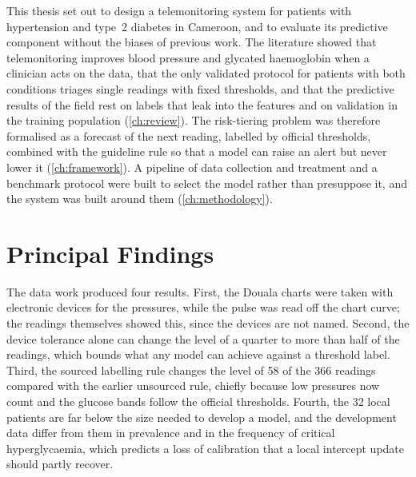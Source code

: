 \documentclass[11pt,a4paper,oneside]{report}
\begin{document}
This thesis set out to design a telemonitoring system for patients with hypertension and type~2 diabetes in Cameroon, and to evaluate its predictive component without the biases of previous work. The literature showed that telemonitoring improves blood pressure and glycated haemoglobin when a clinician acts on the data, that the only validated protocol for patients with both conditions triages single readings with fixed thresholds, and that the predictive results of the field rest on labels that leak into the features and on validation in the training population (\cref{ch:review}). The risk-tiering problem was therefore formalised as a forecast of the next reading, labelled by official thresholds, combined with the guideline rule so that a model can raise an alert but never lower it (\cref{ch:framework}). A pipeline of data collection and treatment and a benchmark protocol were built to select the model rather than presuppose it, and the system was built around them (\cref{ch:methodology}).

\section*{Principal Findings}

The data work produced four results. First, the Douala charts were taken with electronic devices for the pressures, while the pulse was read off the chart curve; the readings themselves showed this, since the devices are not named. Second, the device tolerance alone can change the level of a quarter to more than half of the readings, which bounds what any model can achieve against a threshold label. Third, the sourced labelling rule changes the level of 58 of the 366 readings compared with the earlier unsourced rule, chiefly because low pressures now count and the glucose bands follow the official thresholds. Fourth, the 32 local patients are far below the size needed to develop a model, and the development data differ from them in prevalence and in the frequency of critical hyperglycaemia, which predicts a loss of calibration that a local intercept update should partly recover.
\end{document}
